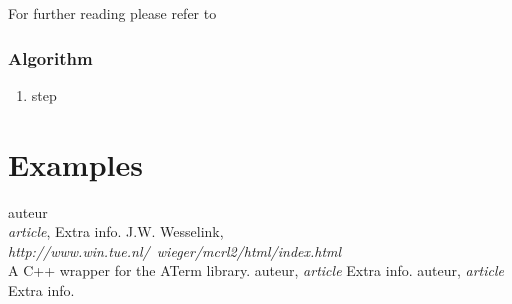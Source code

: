 \documentclass[a4paper,10pt]{article}
\begin{document}
For further reading please refer to \cite{LPEfreevar} 

\subsubsection{Algorithm} \label{sss:alg}
\begin{enumerate}
\item step
\end{enumerate}

\section{Examples}

\newpage
\begin{thebibliography}{99}   auteur\\
   \textit{article},
   Extra info.
   J.W. Wesselink,
   \textit{http://www.win.tue.nl/~wieger/mcrl2/html/index.html}\\
   A C++ wrapper for the ATerm library.
   auteur,
   \textit{article}
   Extra info.
   auteur,
   \textit{article}
   Extra info.

\end{thebibliography}
\end{document}
